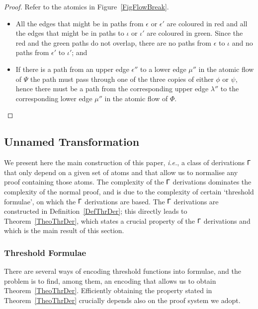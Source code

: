 \begin{proof}
Refer to the atomics in Figure~\ref{FigFlowBreak}.
\begin{itemize}
	\item All the edges that might be in paths from $\epsilon$ or $\epsilon'$ are coloured in red and all the edges that might be in paths to $\iota$ or $\iota'$ are coloured in green. Since the red and the green paths do not overlap, there are no paths from $\epsilon$ to $\iota$ and no paths from $\epsilon'$ to $\iota'$; and
	\item If there is a path from an upper edge $\epsilon''$ to a lower edge $\mu''$ in the atomic flow of $\Psi$ the path must pass through one of the three copies of either $\phi$ or $\psi$, hence there must be a path from the corresponding upper edge $\lambda''$ to the corresponding lower edge $\mu''$ in the atomic flow of $\Phi$.
\end{itemize}
\end{proof}

\subsection{Unnamed Transformation}


We present here the main construction of this paper, \emph{i.e.}, a class of derivations $\mathsf\Gamma$ that only depend on a given set of atoms and that allow us to normalise any proof containing those atoms. The complexity of the $\mathsf\Gamma$ derivations dominates the complexity of the normal proof, and is due to the complexity of certain `threshold formulae', on which the $\mathsf\Gamma$ derivations are based. The $\mathsf\Gamma$ derivations are constructed in Definition~\ref{DefThrDer}; this directly leads to Theorem~\ref{TheoThrDer}, which states a crucial property of the $\mathsf\Gamma$ derivations and which is the main result of this section.

\subsubsection{Threshold Formulae}


There are several ways of encoding threshold functions into formulae, and the problem is to find, among them, an encoding that allows us to obtain Theorem~\ref{TheoThrDer}. Efficiently obtaining the property stated in Theorem~\ref{TheoThrDer} crucially depends also on the proof system we adopt.

